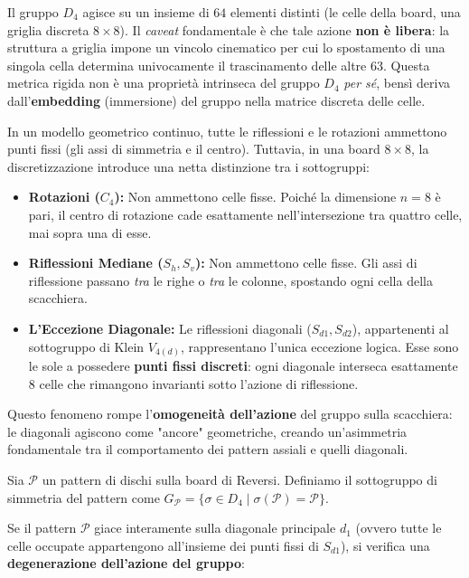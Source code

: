 Il gruppo $D_4$ agisce su un insieme di $64$ elementi distinti (le celle della board, una griglia discreta $8 \times 8$).
Il \textit{caveat} fondamentale è che tale azione \textbf{non è libera}: la struttura a griglia impone un vincolo cinematico per cui lo spostamento di una singola cella determina univocamente il trascinamento delle altre $63$. Questa metrica rigida non è una proprietà intrinseca del gruppo $D_4$ \textit{per sé}, bensì deriva dall'\textbf{embedding} (immersione) del gruppo nella matrice discreta delle celle.

In un modello geometrico continuo, tutte le riflessioni e le rotazioni ammettono punti fissi (gli assi di simmetria e il centro). Tuttavia, in una board $8 \times 8$, la discretizzazione introduce una netta distinzione tra i sottogruppi:

\begin{itemize}
    \item \textbf{Rotazioni ($C_4$):} Non ammettono celle fisse. Poiché la dimensione $n=8$ è pari, il centro di rotazione cade esattamente nell'intersezione tra quattro celle, mai sopra una di esse.
    \item \textbf{Riflessioni Mediane ($S_h, S_v$):} Non ammettono celle fisse. Gli assi di riflessione passano \textit{tra} le righe o \textit{tra} le colonne, spostando ogni cella della scacchiera.
    \item \textbf{L'Eccezione Diagonale:} Le riflessioni diagonali ($S_{d1}, S_{d2}$), appartenenti al sottogruppo di Klein $V_{4(d)}$, rappresentano l'unica eccezione logica. Esse sono le sole a possedere \textbf{punti fissi discreti}: ogni diagonale interseca esattamente $8$ celle che rimangono invarianti sotto l'azione di riflessione. 
\end{itemize}

Questo fenomeno rompe l'\textbf{omogeneità dell'azione} del gruppo sulla scacchiera: le diagonali agiscono come "ancore" geometriche, creando un'asimmetria fondamentale tra il comportamento dei pattern assiali e quelli diagonali.


Sia $\mathcal{P}$ un pattern di dischi sulla board di Reversi. Definiamo il sottogruppo di simmetria del pattern come $G_{\mathcal{P}} = \{ \sigma \in D_4 \mid \sigma(\mathcal{P}) = \mathcal{P} \}$.

Se il pattern $\mathcal{P}$ giace interamente sulla diagonale principale $d_1$ (ovvero tutte le celle occupate appartengono all'insieme dei punti fissi di $S_{d1}$), si verifica una \textbf{degenerazione dell'azione del gruppo}:


